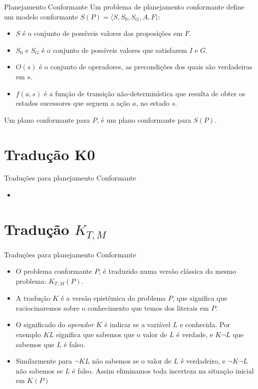 \begin{frame}{Planejamento Conformante}
Um problema de planejamento conformante define um modelo conformante $S(P) = 
\langle S, S_0, S_G, A, F\rangle$:
\begin{itemize}
\item $S$ é o conjunto de possíveis valores das proposições em $F$.
\item $S_0$ e $S_G$ é o conjunto de possíveis valores que satisfazem $I$ e $G$.
\item $O(s)$ é o conjunto de operadores, as precondições dos quais são 
verdadeiras em $s$.
\item $f(a,s)$ é a função de transição não-determinística que resulta de obter 
os estados sucessores que seguem a ação $a$, no estado $s$.
\end{itemize}
Um plano conformante para $P$, é um plano conformante para $S(P)$.
\end{frame}

\section{Tradução K0}


\begin{frame}{Traduções para planejamento Conformante}
    \begin{itemize}
    \item 
    
    \end{itemize}  
\end{frame}

\section{Tradução $K_{T,M}$}


\begin{frame}{Traduções para planejamento Conformante}
\begin{itemize}
\item O problema conformante $P$, é traduzido numa versão clássica do mesmo 
problema: $K_{T,M}(P)$. 
\item A tradução $K$ é a versão epistêmica do problema $P$, que significa que 
raciocinaremos sobre o conhecimento que temos dos literais em $P$.
\item O significado do \textit{operador} $K$ é indicar se a variável $L$ e 
conhecida. Por exemplo $KL$ significa que sabemos que o valor de $L$ é verdade, 
e $K \lnot L$ que sabemos que $L$ é falso.
\item Similarmente para $\lnot KL$ não sabemos se o valor de $L$ é verdadeiro, e 
$\lnot K \lnot L$ não sabemos se $L$ é falso. Assim eliminamos toda incerteza na 
situação inicial em $K(P)$ %
\end{itemize}  
\end{frame}


